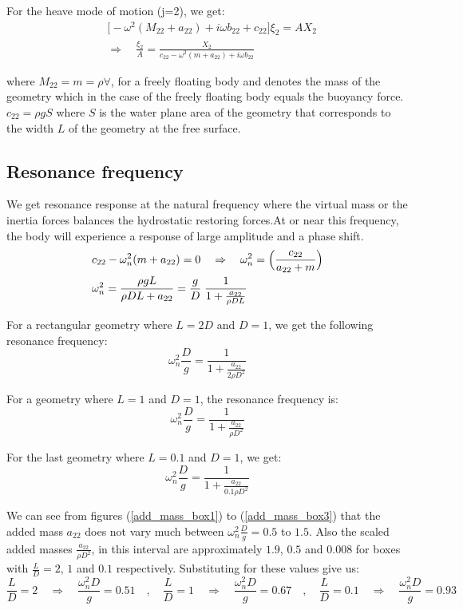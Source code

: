\documentclass[a4paper,10pt]{article}
\begin{document}
For the heave mode of motion (j=2), we get:
\begin{align}
& \Big[- \omega^2 (M_{2 2} + a_{2 2}) + i \omega b_{2 2} + c_{22} \Big] \xi_2 = A X_{2}\\[1em]
& \Rightarrow \quad \frac{\xi_2}{A} = \frac{X_2}{c_{22} - \omega^2(m + a_{22}) + i \omega b_{22} } 
\label{bodyrespons}
\end{align} 

where $M_{22} = m = \rho \forall$, for a freely floating body and denotes the mass of the geometry which in the case of the freely floating body equals the buoyancy force. $c_{22} = \rho g S$ where $S$ is the water plane area of the geometry that corresponds to the width $L$ of the geometry at the free surface.


\subsection{Resonance frequency}

We get resonance response at the natural frequency where the virtual mass or the inertia forces balances the hydrostatic restoring forces.At or near this frequency, the body will experience a response of large amplitude and a phase shift.\\

\begin{align}
&c_{22} - \omega_n^2 (m + a_{22}) = 0 \quad \Rightarrow \quad \omega_n^2 = \Big( \frac{c_{22}}{a_{22} + m} \Big)\\
& \omega_n^2 = \frac{\rho g L}{\rho D L + a_{22}} = \frac{g}{D}\hspace{1mm}\frac{1}{1 + \frac{a_{22}}{\rho D L}} 
\end{align}

For a rectangular geometry where $L=2D$ and $D=1$, we get the following resonance frequency:
$$\omega_n^2 \frac{D}{g} = \frac{1}{1 + \frac{a_{22}}{2 \rho D^2}} $$

For a geometry where $L=1$ and $D=1$, the resonance frequency is:
$$\omega_n^2 \frac{D}{g} = \frac{1}{1 + \frac{a_{22}}{ \rho D^2}} $$

For the last geometry where $L=0.1$ and $D=1$, we get:
$$ \omega_n^2 \frac{D}{g} = \frac{1}{1 + \frac{a_{22}}{ 0.1 \rho D^2}} $$

We can see from figures (\ref{add_mass_box1}) to (\ref{add_mass_box3}) that the added mass $a_{22}$ does not vary much between $\omega_n^2 \frac{D}{g} = 0.5$ to $1.5$. Also the scaled added masses $\frac{a_{22}}{\rho D^2}$, in this interval are approximately $1.9$, $0.5$ and $0.008$ for boxes with $\frac{L}{D} = 2$, $1$ and $0.1$ respectively. Substituting for these values give us:
$$\frac{L}{D}=2 \quad \Rightarrow \quad \frac{\omega_n^2 D}{g} = 0.51 \quad , \quad 
\frac{L}{D}=1 \quad \Rightarrow \quad \frac{\omega_n^2 D}{g} = 0.67 \quad , \quad 
\frac{L}{D}=0.1 \quad \Rightarrow \quad \frac{\omega_n^2 D}{g} = 0.93 $$
\end{document}
